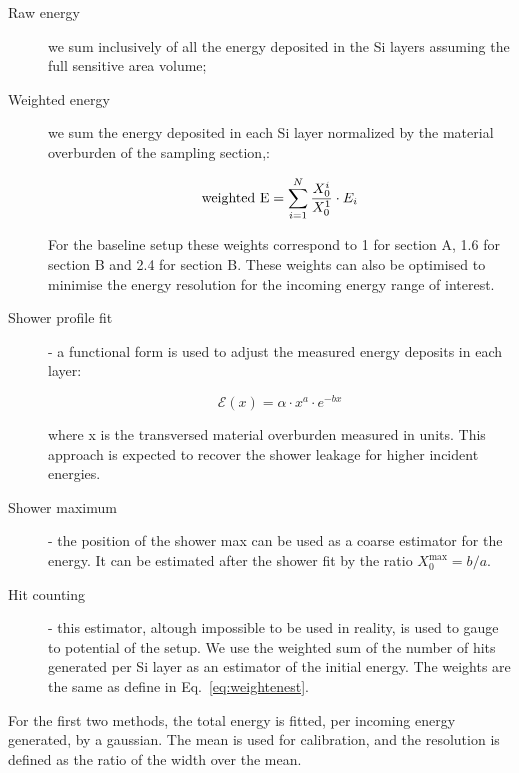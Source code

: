 \begin{description}

\item[Raw energy] we sum inclusively of all the energy deposited in
  the Si layers assuming the full sensitive area volume;

\item[Weighted energy] we sum the energy deposited in each Si layer
  normalized by the material overburden of the sampling section,\ie:

\begin{equation}
{\rm weighted~E}=\sum_{i=1}^{N} \frac{X_0^i}{X_0^1}\cdot E_i
\label{eq:weightenest}
\end{equation}

For the baseline setup these weights correspond to 1 for section A,
1.6 for section B and 2.4 for section B.
These weights can also be optimised to minimise the energy resolution
for the incoming energy range of interest.

\item[Shower profile fit] - a functional form is used to adjust the
  measured energy deposits in each layer:

\begin{equation}
\mathcal{E}(x)=\alpha\cdot x^{a} \cdot e^{-bx} 
\label{eq:showerprof}
\end{equation}

where x is the transversed material overburden measured in \Xnot
units. This approach is expected to recover the shower leakage for
higher incident energies.

\item[Shower maximum] - the position of the shower max can be used as a
  coarse estimator for the energy. It can be estimated after the
  shower fit by the ratio $X_{0}^{\max}=b/a$.

\item[Hit counting] - this estimator, altough impossible to be used in
  reality, is used to gauge to potential of the setup. We use the
  weighted sum  of the number of hits generated per Si layer as an
  estimator of the initial energy. The weights are the same as define
  in Eq.~\ref{eq:weightenest}.

\end{description}

For the first two methods, the total energy is fitted, per incoming
energy generated, by a gaussian. The mean is used for calibration, and
the resolution is defined as the ratio of the width over the mean.

